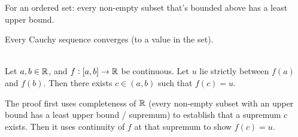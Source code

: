 \documentclass[12pt]{article}
\begin{document}
\begin{definition*}
  For an ordered set: every non-empty subset that's bounded above has a least upper bound.
\end{definition*}


\begin{definition*}
  Every Cauchy sequence converges (to a value in the set).
\end{definition*}


\begin{theorem*}~\\
  Let $a, b \in \mathbb{R}$, and $f:[a, b] \to \mathbb{R}$ be continuous. Let $u$ lie strictly between $f(a)$ and
  $f(b)$. Then there exists $c \in (a, b)$ such that $f(c) = u$.
\end{theorem*}

\begin{remark*}
  The proof first uses completeness of $\mathbb{R}$ (every non-empty subset with an upper bound has a least
  upper bound / supremum) to establish that a supremum $c$ exists. Then it uses continuity of $f$
  at that supremum to show $f(c) = u$.
\end{remark*}
\end{document}
